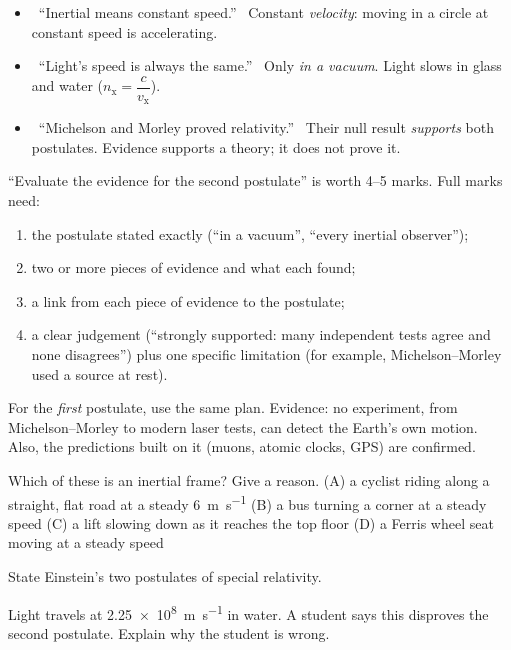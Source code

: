 \begin{mistakes}
\begin{itemize}
  \item \xmark\ ``Inertial means constant speed.'' \cmark\ Constant \emph{velocity}: moving in a
        circle at constant speed is accelerating.
  \item \xmark\ ``Light's speed is always the same.'' \cmark\ Only \emph{in a vacuum}. Light slows
        in glass and water ($n_\mathrm{x} = \dfrac{c}{v_\mathrm{x}}$).
  \item \xmark\ ``Michelson and Morley proved relativity.'' \cmark\ Their null result
        \emph{supports} both postulates. Evidence supports a theory; it does not prove it.
\end{itemize}
\end{mistakes}

\begin{examtip}
``Evaluate the evidence for the second postulate'' is worth 4--5 marks. Full marks need:
\begin{enumerate}
  \item the postulate stated exactly (``in a vacuum'', ``every inertial observer'');
  \item two or more pieces of evidence and what each found;
  \item a link from each piece of evidence to the postulate;
  \item a clear judgement (``strongly supported: many independent tests agree and none
        disagrees'') plus one specific limitation (for example, Michelson--Morley used a source
        at rest).
\end{enumerate}
For the \emph{first} postulate, use the same plan. Evidence: no experiment, from
Michelson--Morley to modern laser tests, can detect the Earth's own motion. Also, the
predictions built on it (muons, atomic clocks, GPS) are confirmed.
\end{examtip}

\begin{quickcheck}
  \item Which of these is an inertial frame? Give a reason. (A) a cyclist riding along a
        straight, flat road at a steady \qty{6}{m.s^{-1}} (B) a bus turning a corner at a steady
        speed (C) a lift slowing down as it reaches the top floor (D) a Ferris wheel seat moving
        at a steady speed
  \item State Einstein's two postulates of special relativity.
  \item Light travels at \qty{2.25e8}{m.s^{-1}} in water. A student says this disproves the
        second postulate. Explain why the student is wrong.
\end{quickcheck}

